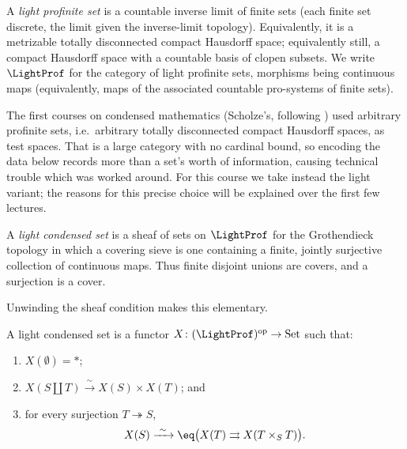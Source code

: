 \begin{definition}
\label{def:1:light-profinite}
A \emph{light profinite set} is a countable inverse limit of finite sets (each
finite set discrete, the limit given the inverse-limit topology). Equivalently,
it is a metrizable totally disconnected compact Hausdorff space; equivalently
still, a compact Hausdorff space with a countable basis of clopen subsets. We
write $\LightProf$ for the category of light profinite sets, morphisms being
continuous maps (equivalently, maps of the associated countable pro-systems of
finite sets).
\end{definition}

\begin{remark}
\label{rmk:1:why-light}
The first courses on condensed mathematics (Scholze's, following
\cite{clausen2019condensed}) used arbitrary profinite sets, i.e.\ arbitrary
totally disconnected compact Hausdorff spaces, as test spaces. That is a large
category with no cardinal bound, so encoding the data below records more than a
set's worth of information, causing technical trouble which was worked around.
For this course we take instead the light variant; the reasons for this precise
choice will be explained over the first few lectures.
\end{remark}

\begin{definition}
\label{def:1:light-condensed}
A \emph{light condensed set} is a sheaf of sets on $\LightProf$ for the
Grothendieck topology in which a covering sieve is one containing a finite,
jointly surjective collection of continuous maps. Thus finite disjoint unions are
covers, and a surjection is a cover.
\end{definition}

Unwinding the sheaf condition makes this elementary.

\begin{definition}
\label{def:1:light-condensed-explicit}
A light condensed set is a functor $X\colon (\LightProf)^{\mathrm{op}}\to\mathrm{Set}$
such that:
\begin{enumerate}
\item $X(\emptyset)=\ast$;
\item $X(S\amalg T)\xrightarrow{\ \sim\ } X(S)\times X(T)$; and
\item for every surjection $T\twoheadrightarrow S$,
\begin{equation*}
X(S)\xrightarrow{\ \sim\ }\eq\bigl(X(T)\rightrightarrows X(T\times_S T)\bigr).
\end{equation*}
\end{enumerate}
\end{definition}

